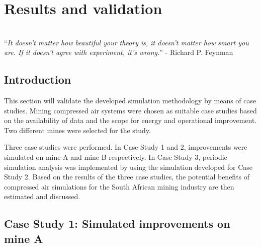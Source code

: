 \chapter{Results and validation}
\thispagestyle{empty}
\vspace{40em}
\hrulefill \\
\enquote{\textit{It doesn't matter how beautiful your theory is, it doesn't matter how smart you are. If it doesn't agree with experiment, it's wrong.}} - Richard P. Feynman\\
\newpage
\section{Introduction}
This section will validate the developed simulation methodology by means of case studies. Mining compressed air systems were chosen as suitable case studies based on the availability of data and the scope for energy and operational improvement. Two different mines were selected for the study. 
\par 
Three case studies were performed. In Case Study 1 and 2, improvements were simulated on mine A and mine B respectively. In Case Study 3, periodic simulation analysis was implemented by using the simulation developed for Case Study 2. Based on the results of the three case studies, the potential benefits of compressed air simulations for the South African mining industry are then estimated and discussed.

\section{Case Study 1: Simulated improvements on mine A}
